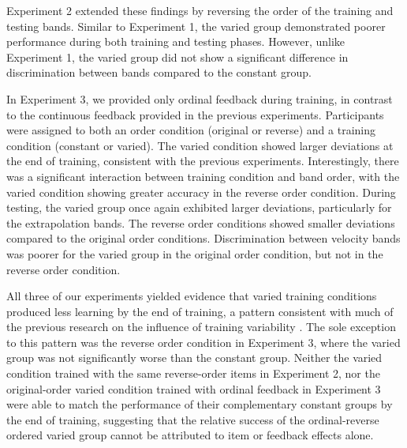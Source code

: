 \documentclass[
  12pt,
  letterpaper,
]{article}
\begin{document}
Experiment 2 extended these findings by reversing the order of the
training and testing bands. Similar to Experiment 1, the varied group
demonstrated poorer performance during both training and testing phases.
However, unlike Experiment 1, the varied group did not show a
significant difference in discrimination between bands compared to the
constant group.

In Experiment 3, we provided only ordinal feedback during training, in
contrast to the continuous feedback provided in the previous
experiments. Participants were assigned to both an order condition
(original or reverse) and a training condition (constant or varied). The
varied condition showed larger deviations at the end of training,
consistent with the previous experiments. Interestingly, there was a
significant interaction between training condition and band order, with
the varied condition showing greater accuracy in the reverse order
condition. During testing, the varied group once again exhibited larger
deviations, particularly for the extrapolation bands. The reverse order
conditions showed smaller deviations compared to the original order
conditions. Discrimination between velocity bands was poorer for the
varied group in the original order condition, but not in the reverse
order condition.

All three of our experiments yielded evidence that varied training
conditions produced less learning by the end of training, a pattern
consistent with much of the previous research on the influence of
training variability
\autocite{catalanoDistantTransferCoincident1984a,wrisbergVariabilityPracticeHypothesis1987,soderstromLearningPerformanceIntegrative2015}.
The sole exception to this pattern was the reverse order condition in
Experiment 3, where the varied group was not significantly worse than
the constant group. Neither the varied condition trained with the same
reverse-order items in Experiment 2, nor the original-order varied
condition trained with ordinal feedback in Experiment 3 were able to
match the performance of their complementary constant groups by the end
of training, suggesting that the relative success of the ordinal-reverse
ordered varied group cannot be attributed to item or feedback effects
alone.
\end{document}

